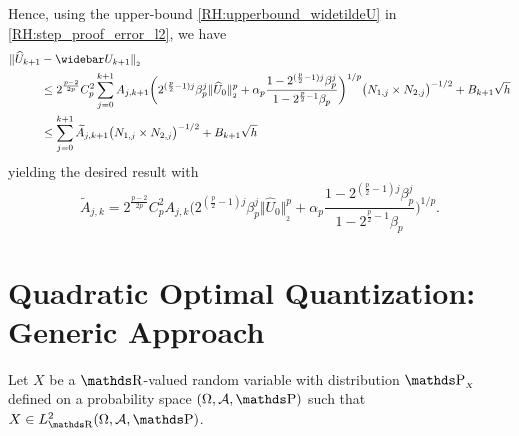 Hence, using the upper-bound \eqref{RH:upperbound_widetildeU} in \eqref{RH:step_proof_error_l2}, we have
\begin{equation}
	\begin{aligned}
		\Vert \widehat U_{k+1} & - \widebar U_{k+1} \Vert_{_2}                                                                                                                                                                                                                                                                            \\
		                       & \leq 2^{\frac{p-2}{2p}} C_p^2 \sum_{j=0}^{k+1} A_{j,k+1} \bigg( 2^{(\frac{p}{2}-1 )j} \beta_{p}^j \Vert \widehat U_0 \Vert_{_2}^p + \alpha_{p} \frac{1 - 2^{(\frac{p}{2}-1 )j} \beta_{p}^j }{1 - 2^{\frac{p}{2}-1} \beta_{p} } \bigg)^{1/p} \big( N_{1,j} \times N_{2,j} \big)^{-1/2} + B_{k+1} \sqrt{h} \\
		                       & \leq \sum_{j=0}^{k+1} \widetilde A_{j,k+1} \big( N_{1,j} \times N_{2,j} \big)^{-1/2} + B_{k+1} \sqrt{h}                                                                                                                                                                                                  \\
	\end{aligned}
\end{equation}
yielding the desired result with
\begin{equation}
	\widetilde A_{j,k} = 2^{\frac{p-2}{2p}} C_p^2 A_{j,k} \bigg( 2^{(\frac{p}{2}-1 )j} \beta_{p}^j \Vert \widehat U_0 \Vert_{_2}^p + \alpha_{p} \frac{1 - 2^{(\frac{p}{2}-1 )j} \beta_{p}^j }{1 - 2^{\frac{p}{2}-1} \beta_{p} } \bigg)^{1/p}.
\end{equation}


















\section{Quadratic Optimal Quantization: Generic Approach} \label{RH:appendix:optquant}

Let $X$ be a $\R$-valued random variable with distribution $\Prob_{_{X}}$ defined on a probability space $ ( \Omega, \A, \Prob )$ such that $X \in L^2_{\R} ( \Omega, \A, \Prob )$.

